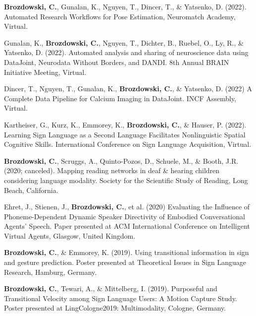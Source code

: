 \par
\begin{cvparagraphlist}
  \textbf{Brozdowski, C.}, Gunalan, K., Nguyen, T., Dincer, T., \& Yatsenko, D. (2022). Automated Research Workflows for Pose Estimation, Neuromatch Academy, Virtual. \par
  Gunalan, K., \textbf{Brozdowski, C.}, Nguyen, T., Dichter, B., Ruebel, O., Ly, R., \& Yatsenko, D. (2022). Automated analysis and sharing of neuroscience data using DataJoint, Neurodata Without Borders, and DANDI. 8th Annual BRAIN Initiative Meeting, Virtual. \par
  Dincer, T., Nguyen, T., Gunalan, K., \textbf{Brozdowski, C.}, \& Yatsenko, D. (2022) A Complete Data Pipeline for Calcium Imaging in DataJoint. INCF Assembly, Virtual. \par
  Kartheiser, G., Kurz, K., Emmorey, K., \textbf{Brozdowski, C.}, \& Hauser, P. (2022). Learning Sign Language as a Second Language Facilitates Nonlinguistic Spatial Cognitive Skills. International Conference on Sign Language Acquisition, Virtual. \par
  \textbf{Brozdowski, C.}, Scruggs, A., Quinto-Pozos, D., Schuele, M., \& Booth, J.R. (2020; canceled). Mapping reading networks in deaf \& hearing children considering language modality. Society for the Scientific Study of Reading, Long Beach, California. \par
  Ehret, J., Stienen, J., \textbf{Brozdowski, C.}, et al. (2020) Evaluating the Influence of Phoneme-Dependent Dynamic Speaker Directivity of Embodied Conversational Agents' Speech. Paper presented at ACM International Conference on Intelligent Virtual Agents, Glasgow, United Kingdom. \par
  \textbf{Brozdowski, C.}, \& Emmorey, K. (2019). Using transitional information in sign and gesture prediction. Poster presented at Theoretical Issues in Sign Language Research, Hamburg, Germany. \par
  \textbf{Brozdowski, C.}, Tewari, A., \& Mittelberg, I. (2019). Purposeful and Transitional Velocity among Sign Language Users: A Motion Capture Study. Poster presented at LingCologne2019: Multimodality, Cologne, Germany. \par
\end{cvparagraphlist}